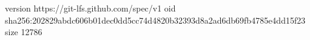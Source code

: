 version https://git-lfs.github.com/spec/v1
oid sha256:202829abdc606b01dec0dd5cc74d4820b32393d8a2ad6db69fb4785e4dd15f23
size 12786
